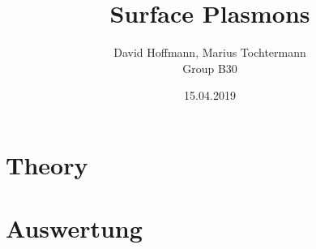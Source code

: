 \documentclass[twoside,english,headsepline=on,DIV=12]{scrartcl}
\numberwithin{equation}{section}
\begin{document}
\titlehead{{\Large Universität Stuttgart
\hfill SS 19\\}
Physikalisches Praktikum II}
\subject{Laboratory Report}
\title{Surface Plasmons}
\author{David Hoffmann, Marius Tochtermann \\
Group B30}
\publishers{}
\date{15.04.2019}
\maketitle
\begin{abstract}
\end{abstract}
\tableofcontents
\newpage
\section{Theory}
\section{Auswertung}
\end{document}

